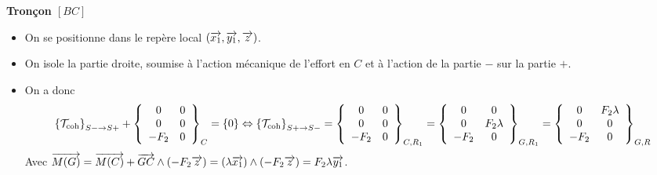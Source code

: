 \documentclass[10pt,fleqn]{article} %
\begin{document}
\begin{multicols}{2}
\textbf{Tronçon $[BC]$}
\begin{itemize}
\item On se positionne dans le repère local $\left(\vect{x_1},\vect{y_1},\vect{z}\right)$.
\item On isole la partie droite, soumise à l'action mécanique de l'effort en $C$ et à l'action de la partie $-$ sur la partie $+$.
\item On a donc $$
\torseurscoh_{S-\rightarrow S+} +
 \torseurcol{0}{0}{-F_2}{0}{0}{0}{C} 
 = \{0\} 
 \Leftrightarrow 
 \torseurscoh_{S+\rightarrow S-} 
 =
 \torseurcol{0}{0}{-F_2}{0}{0}{0}{C,R_1} 
  = \torseurcol{0}{0}{-F_2}{0}{F_2\lambda }{0}{G,R_1}
    = \torseurcol{0}{0}{-F_2}{F_2\lambda}{0 }{0}{G,R}
$$
Avec $\vect{M(G)} 
= \vect{M(C)}+\vect{GC}\wedge\left(-F_2 \vect{z}\right)
= \left(\lambda \vect{x_1} \right)\wedge\left(-F_2 \vect{z}\right)
= F_2\lambda \vect{y_1}
$.
\end{itemize}

\ifprof
\else
\end{multicols}
\fi
\end{document}
